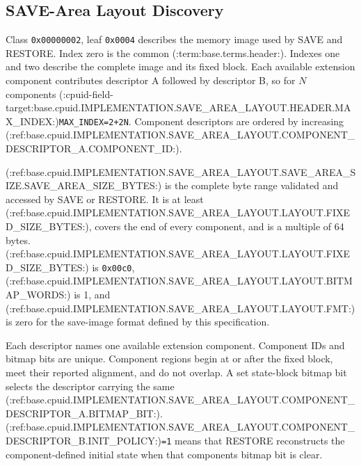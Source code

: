 \subsection{SAVE-Area Layout Discovery}
Class \texttt{0x00000002}, leaf \texttt{0x0004} describes the memory image used by SAVE and RESTORE. Index zero is
the common (:term:base.terms.header:). Indexes one and two describe the complete image and its fixed block. Each available extension
component contributes descriptor A followed by descriptor B, so for $N$ components
(:cpuid-field-target:base.cpuid.IMPLEMENTATION.SAVE_AREA_LAYOUT.HEADER.MAX_INDEX:)\texttt{MAX\_INDEX}\texttt{=2+2N}. Component descriptors are ordered by increasing (:ref:base.cpuid.IMPLEMENTATION.SAVE_AREA_LAYOUT.COMPONENT_DESCRIPTOR_A.COMPONENT_ID:).



(:ref:base.cpuid.IMPLEMENTATION.SAVE_AREA_LAYOUT.SAVE_AREA_SIZE.SAVE_AREA_SIZE_BYTES:) is the complete byte range validated and accessed by SAVE or RESTORE. It is at
least (:ref:base.cpuid.IMPLEMENTATION.SAVE_AREA_LAYOUT.LAYOUT.FIXED_SIZE_BYTES:), covers the end of every component, and is a multiple of 64 bytes.
(:ref:base.cpuid.IMPLEMENTATION.SAVE_AREA_LAYOUT.LAYOUT.FIXED_SIZE_BYTES:) is \texttt{0x00c0}, (:ref:base.cpuid.IMPLEMENTATION.SAVE_AREA_LAYOUT.LAYOUT.BITMAP_WORDS:) is 1, and (:ref:base.cpuid.IMPLEMENTATION.SAVE_AREA_LAYOUT.LAYOUT.FMT:) is zero for the
save-image format defined by this specification.

Each descriptor names one available extension component. Component IDs and bitmap bits are unique. Component
regions begin at or after the fixed block, meet their reported alignment, and do not overlap. A set state-block
bitmap bit selects the descriptor carrying the same (:ref:base.cpuid.IMPLEMENTATION.SAVE_AREA_LAYOUT.COMPONENT_DESCRIPTOR_A.BITMAP_BIT:). (:ref:base.cpuid.IMPLEMENTATION.SAVE_AREA_LAYOUT.COMPONENT_DESCRIPTOR_B.INIT_POLICY:)\texttt{=1} means that
RESTORE reconstructs the component-defined initial state when that component\textquotesingle{}s bitmap bit is clear.
